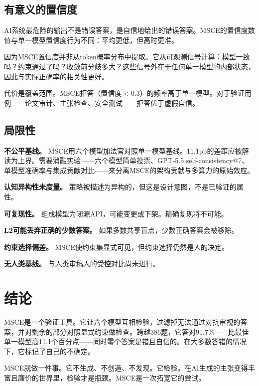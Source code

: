 \documentclass[11pt,a4paper]{ctexart}
\begin{document}
\subsection{有意义的置信度}

AI系统最危险的输出不是错误答案，是自信地给出的错误答案。MSCE的置信度数值与单一模型置信度行为不同：平均更低，但高时更准。

因为MSCE置信度并非从token概率分布中提取。它从可观测信号计算：模型一致吗？约束通过了吗？收敛前分歧多大？这些信号外在于任何单一模型的内部状态，因此与实际正确率的相关性更好。

代价是覆盖范围。MSCE拒答（置信度$<$0.3）的频率高于单一模型。对于验证用例——论文审计、主张检查、安全测试——拒答优于虚假自信。

\subsection{局限性}

\textbf{不公平基线。} MSCE用六个模型加法官对照单一模型基线。11.1pp的差距应被解读为上界。需要消融实验——六个模型简单投票、GPT-5.5 self-consistency@7、单模型准确率与集成贡献对比——来分离MSCE的架构贡献与多算力的原始效应。

\textbf{认知异构性未度量。} 策略被描述为异构的，但这是设计意图，不是已验证的属性。

\textbf{可复现性。} 组成模型为闭源API，可能变更或下架。精确复现将不可能。

\textbf{L2可能丢弃正确的少数答案。} 如果多数共享盲点，少数正确答案会被移除。

\textbf{约束选择偏差。} MSCE使约束集显式可见，但约束选择仍然是人的决定。

\textbf{无人类基线。} 与人类审稿人的受控对比尚未进行。

\section{结论}

MSCE是一个验证工具。它让六个模型互相检验，过滤掉无法通过对抗审视的答案，并对剩余的部分对照显式约束做检查。跨越386题，它答对91.7\%——比最佳单一模型高11.1个百分点——同时零个答案是错且自信的。在大多数答错的情况下，它标记了自己的不确定。

MSCE就做一件事。它不生成、不创造、不发现。它检验。在AI生成的主张变得丰富且廉价的世界里，检验才是瓶颈。MSCE是一次拓宽它的尝试。
\end{document}
